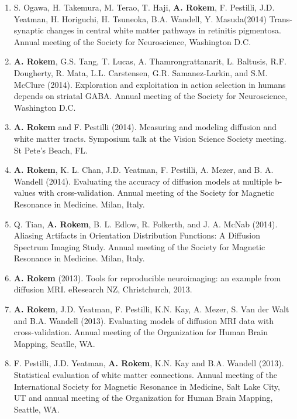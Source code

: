 \documentclass[11pt,fullpage]{article}
\begin{document}
\begin{enumerate}
\item S. Ogawa, H. Takemura, M. Terao, T. Haji, {\bf A. Rokem}, F. Pestilli, J.D. Yeatman, H. Horiguchi, H. Tsuneoka, B.A. Wandell, Y. Masuda(2014) Trans-synaptic changes in central white matter pathways in retinitis pigmentosa. Annual meeting of the Society for Neuroscience, Washington D.C.

\item {\bf A. Rokem}, G.S. Tang, T. Lucas, A. Thamrongrattanarit, L. Baltusis, R.F. Dougherty, R. Mata, L.L. Carstensen, G.R. Samanez-Larkin, and S.M. McClure (2014). Exploration and exploitation in action selection in humans depends on striatal GABA. Annual meeting of the Society for Neuroscience, Washington D.C.

\item {\bf A. Rokem} and F. Pestilli (2014). Measuring and modeling diffusion and white matter tracts. Symposium talk at the Vision Science Society meeting. St Pete's Beach, FL.

\item {\bf A. Rokem}, K. L. Chan, J.D. Yeatman, F. Pestilli, A. Mezer, and B. A. Wandell (2014). Evaluating the accuracy of diffusion models at multiple b-values with cross-validation. Annual meeting of the Society for Magnetic Resonance in Medicine. Milan, Italy.

\item Q. Tian, {\bf A. Rokem}, B. L. Edlow, R. Folkerth, and J. A. McNab (2014). Aliasing Artifacts in Orientation Distribution Functions: A Diffusion Spectrum Imaging Study. Annual meeting of the Society for Magnetic Resonance in Medicine. Milan, Italy.

\item {\bf A. Rokem} (2013). Tools for reproducible neuroimaging: an example from diffusion MRI. eResearch NZ, Christchurch, 2013.

\item {\bf A. Rokem}, J.D. Yeatman, F. Pestilli, K.N. Kay, A. Mezer, S. Van der Walt and B.A. Wandell (2013). Evaluating models of diffusion MRI data with cross-validation. Annual meeting of the Organization for Human Brain Mapping, Seatlle, WA.

\item F. Pestilli, J.D. Yeatman, {\bf A. Rokem}, K.N. Kay and B.A. Wandell (2013). Statistical evaluation of white matter connections. Annual meeting of the International Society for Magnetic Resonance in Medicine, Salt Lake City, UT and annual meeting of the Organization for Human Brain Mapping, Seattle, WA.


\end{enumerate}
\end{document}
